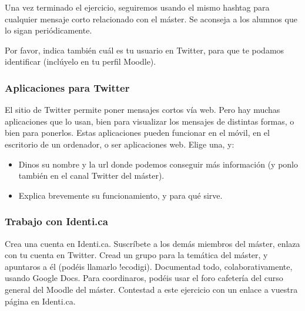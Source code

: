 \documentclass[a4paper,12pt]{article}
\begin{document}
Una vez terminado el ejercicio, seguiremos usando el mismo hashtag para cualquier mensaje corto relacionado con el máster. Se aconseja a los alumnos que lo sigan periódicamente.

Por favor, indica también cuál es tu usuario en Twitter, para que te podamos identificar (inclúyelo en tu perfil Moodle).

\subsubsection{Aplicaciones para Twitter}
\label{sub:apptwitter}

El sitio de Twitter permite poner mensajes cortos vía web. Pero hay muchas aplicaciones que lo usan, bien para visualizar los mensajes de distintas formas, o bien para ponerlos. Estas aplicaciones pueden funcionar en el móvil, en el escritorio de un ordenador, o ser aplicaciones web. Elige una, y:

\begin{itemize}
\item Dinos su nombre y la url donde podemos conseguir más información (y ponlo también en el canal Twitter del máster).
\item Explica brevemente su funcionamiento, y para qué sirve.
\end{itemize}

\subsubsection{Trabajo con Identi.ca}
\label{sub:identica}

Crea una cuenta en Identi.ca. Suscríbete a los demás miembros del máster, enlaza con tu cuenta en Twitter. Cread un grupo para la temática del máster, y apuntaros a él (podéis llamarlo !ecodigi). Documentad todo, colaborativamente, usando Google Docs. Para coordinaros, podéis usar el foro cafetería del curso general del Moodle del máster. Contestad a este ejercicio con un enlace a vuestra página en Identi.ca.
\end{document}
